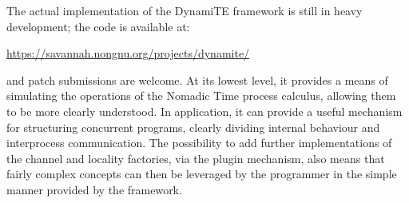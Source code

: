 The actual implementation of the DynamiTE framework is still in heavy
development; the code is available at:
\begin{center}
\url{https://savannah.nongnu.org/projects/dynamite/} 
\end{center}
\noindent and patch submissions are welcome.  At its lowest level, it
provides a means of simulating the operations of the Nomadic Time
process calculus, allowing them to be more clearly understood.  In
application, it can provide a useful mechanism for structuring
concurrent programs, clearly dividing internal behaviour and
interprocess communication.  The possibility to add further
implementations of the channel and locality factories, via the plugin
mechanism, also means that fairly complex concepts can then be
leveraged by the programmer in the simple manner provided by the
framework.
